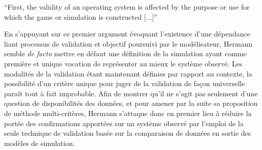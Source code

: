 \foreignquote{english}{First, the validity of an operating system is affected by the purpose or use for which the game or simulation is constructed [...]}\autocite[217]{Hermann1967}




En s'appuyant sur ce premier argument évoquant l'existence d'une dépendance liant processus de validation et objectif poursuivi par le modélisateur, Hermann semble \textit{de facto} mettre en défaut une définition de la simulation ayant comme première et unique vocation de représenter au mieux le système observé. Les modalités de la validation étant maintenant définies par rapport au contexte, la possibilité d'un critère unique pour juger de la validation de façon universelle paraît tout à fait improbable. Afin de montrer qu'il ne s'agit pas seulement d'une question de disponibilités des données, et pour amener par la suite sa proposition de méthode multi-critères, Hermann s'attaque donc en premier lieu à réduire la portée des confirmations apportées sur un système observé par l'emploi de la seule technique de validation basée sur la comparaison de données en sortie des modèles de simulation.

